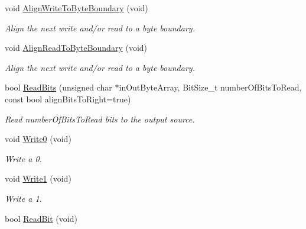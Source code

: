 \begin{DoxyCompactItemize}
\item 
void \hyperlink{class_rak_net_1_1_bit_stream_a157d750a205462beb3b418ade252cf19}{Align\-Write\-To\-Byte\-Boundary} (void)
\begin{DoxyCompactList}\small\item\em Align the next write and/or read to a byte boundary. \end{DoxyCompactList}\item 
void \hyperlink{class_rak_net_1_1_bit_stream_aadbbeb19cf6b7fbb5c170ae366d4be30}{Align\-Read\-To\-Byte\-Boundary} (void)
\begin{DoxyCompactList}\small\item\em Align the next write and/or read to a byte boundary. \end{DoxyCompactList}\item 
bool \hyperlink{class_rak_net_1_1_bit_stream_a386965784e4352212b047c1c3dcb51f3}{Read\-Bits} (unsigned char $\ast$in\-Out\-Byte\-Array, Bit\-Size\-\_\-t number\-Of\-Bits\-To\-Read, const bool align\-Bits\-To\-Right=true)
\begin{DoxyCompactList}\small\item\em Read {\itshape number\-Of\-Bits\-To\-Read} bits to the output source. \end{DoxyCompactList}\item 
\hypertarget{class_rak_net_1_1_bit_stream_ad944a6707a90f1727bcc5ac8de2b58bd}{void \hyperlink{class_rak_net_1_1_bit_stream_ad944a6707a90f1727bcc5ac8de2b58bd}{Write0} (void)}\label{class_rak_net_1_1_bit_stream_ad944a6707a90f1727bcc5ac8de2b58bd}

\begin{DoxyCompactList}\small\item\em Write a 0. \end{DoxyCompactList}\item 
\hypertarget{class_rak_net_1_1_bit_stream_a185c35c9ca1fc58057d9e94a025d3961}{void \hyperlink{class_rak_net_1_1_bit_stream_a185c35c9ca1fc58057d9e94a025d3961}{Write1} (void)}\label{class_rak_net_1_1_bit_stream_a185c35c9ca1fc58057d9e94a025d3961}

\begin{DoxyCompactList}\small\item\em Write a 1. \end{DoxyCompactList}\item 
\hypertarget{class_rak_net_1_1_bit_stream_a48bf969fc517f2e568ce02c4a859cc27}{bool \hyperlink{class_rak_net_1_1_bit_stream_a48bf969fc517f2e568ce02c4a859cc27}{Read\-Bit} (void)}\label{class_rak_net_1_1_bit_stream_a48bf969fc517f2e568ce02c4a859cc27}


\end{DoxyCompactItemize}
